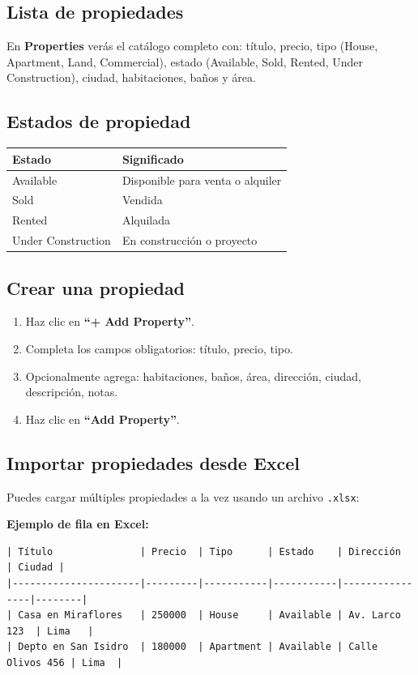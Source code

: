 \documentclass[12pt,oneside]{article}
\begin{document}
\subsection{Lista de propiedades}

En \textbf{Properties} verás el catálogo completo con: título, precio, tipo (House, Apartment, Land, Commercial), estado (Available, Sold, Rented, Under Construction), ciudad, habitaciones, baños y área.

\subsection{Estados de propiedad}

\begin{tabularx}{\textwidth}{|X|X|}
\hline
\rowcolor{primary!10}
\textbf{Estado} & \textbf{Significado} \\
\hline
Available & Disponible para venta o alquiler \\
\hline
Sold & Vendida \\
\hline
Rented & Alquilada \\
\hline
Under Construction & En construcción o proyecto \\
\hline
\end{tabularx}

\subsection{Crear una propiedad}

\begin{enumerate}[leftmargin=*]
  \item Haz clic en \textbf{“+ Add Property”}.
  \item Completa los campos obligatorios: título, precio, tipo.
  \item Opcionalmente agrega: habitaciones, baños, área, dirección, ciudad, descripción, notas.
  \item Haz clic en \textbf{“Add Property”}.
\end{enumerate}

\subsection{Importar propiedades desde Excel}

Puedes cargar múltiples propiedades a la vez usando un archivo \texttt{.xlsx}:

\noindent\textbf{Ejemplo de fila en Excel:}

\begin{verbatim}
| Título               | Precio  | Tipo      | Estado    | Dirección      | Ciudad |
|----------------------|---------|-----------|-----------|----------------|--------|
| Casa en Miraflores   | 250000  | House     | Available | Av. Larco 123  | Lima   |
| Depto en San Isidro  | 180000  | Apartment | Available | Calle Olivos 456 | Lima  |
\end{verbatim}
\end{document}
